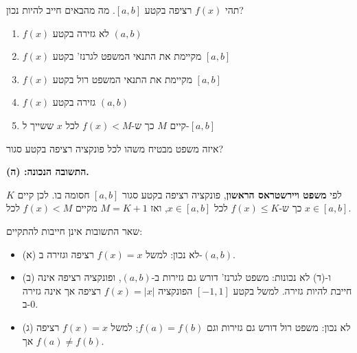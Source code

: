 
\begin{question}
תהי $f(x)$ רציפה בקטע $[a,b]$. מה מהבאים חייב להיות נכון?
\begin{enumerate}
  \item[(א)] $f(x)$ לא גזירה בקטע $(a,b)$
  \item[(ב)] $f(x)$ מקיימת את התנאי המשפט לגרנז' בקטע $[a,b]$
  \item[(ג)] $f(x)$ מקיימת את התנאי המשפט רול בקטע $[a,b]$
  \item[(ד)] $f(x)$ גזירה בקטע $(a,b)$
  \item[(ה)] קיים $M$ כך ש-$f(x)<M$ לכל $x$ ששייך ל-$[a,b]$
\end{enumerate}
\end{question}

\begin{hint}
איזה משפט מבטיח משהו לכל פונקציה רציפה בקטע סגור?
\end{hint}

\begin{solution}
\textbf{התשובה הנכונה: (ה).}

לפי \textbf{משפט ויירשטראס הראשון}, פונקציה רציפה בקטע סגור $[a,b]$ חסומה בו. לכן קיים $K$ כך ש-$f(x)\le K$ לכל $x\in[a,b]$, ואז $M=K+1$ מקיים $f(x)<M$ לכל $x\in[a,b]$.

שאר התשובות אינן חייבות להתקיים:
\begin{itemize}
  \item (א) לא נכון: למשל $f(x)=x$ רציפה וגזירה ב-$(a,b)$.
  \item (ב) ו-(ד) לא נכונות: משפט לגרנז' דורש גם גזירות ב-$(a,b)$, ופונקציה רציפה אינה חייבת להיות גזירה. למשל בקטע $[-1,1]$ הפונקציה $f(x)=|x|$ רציפה אך אינה גזירה ב-$0$.
  \item (ג) לא נכון: משפט רול דורש גם גזירות וגם $f(a)=f(b)$; למשל $f(x)=x$ רציפה אך $f(a)\ne f(b)$.
\end{itemize}
\end{solution}
